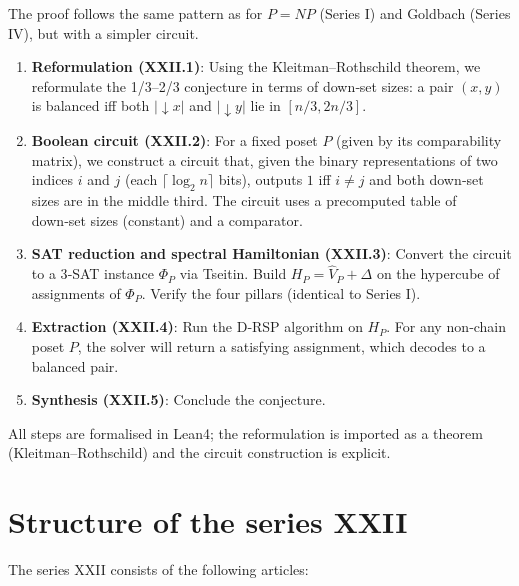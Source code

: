 \documentclass[11pt,a4paper]{article}
\begin{document}
The proof follows the same pattern as for $P = NP$ (Series I) and Goldbach (Series IV), but with a simpler circuit.

\begin{enumerate}
\item \textbf{Reformulation (XXII.1)}: Using the Kleitman–Rothschild theorem, we reformulate the 1/3–2/3 conjecture in terms of down‑set sizes: a pair $(x,y)$ is balanced iff both $|\downarrow x|$ and $|\downarrow y|$ lie in $[n/3, 2n/3]$.
\item \textbf{Boolean circuit (XXII.2)}: For a fixed poset $P$ (given by its comparability matrix), we construct a circuit that, given the binary representations of two indices $i$ and $j$ (each $\lceil \log_2 n\rceil$ bits), outputs $1$ iff $i \neq j$ and both down‑set sizes are in the middle third. The circuit uses a precomputed table of down‑set sizes (constant) and a comparator.
\item \textbf{SAT reduction and spectral Hamiltonian (XXII.3)}: Convert the circuit to a 3‑SAT instance $\Phi_P$ via Tseitin. Build $H_P = \hat{V}_P + \Delta$ on the hypercube of assignments of $\Phi_P$. Verify the four pillars (identical to Series I).
\item \textbf{Extraction (XXII.4)}: Run the D‑RSP algorithm on $H_P$. For any non‑chain poset $P$, the solver will return a satisfying assignment, which decodes to a balanced pair.
\item \textbf{Synthesis (XXII.5)}: Conclude the conjecture.
\end{enumerate}

All steps are formalised in Lean4; the reformulation is imported as a theorem (Kleitman–Rothschild) and the circuit construction is explicit.

\section{Structure of the series XXII}

The series XXII consists of the following articles:
\end{document}
